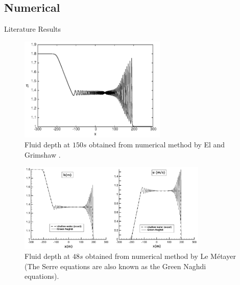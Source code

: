 \documentclass[pdf]{beamer}
\begin{document}
\subsection{Numerical}
\begin{frame}{Literature Results}
\begin{figure}
	\centering
	\includegraphics[width=7cm]{../Pics/Lit/SmoothDBEl.png}
	\caption{Fluid depth at $150s$ obtained from numerical method by El and Grimshaw \cite{El-etal-2006}.}
	\label{fig:ElDB}
\end{figure}	
\end{frame}

\begin{frame}{}
	\begin{figure}
		\centering
		\includegraphics[width=9cm]{../Pics/Lit/DBhank.png}
		\caption{Fluid depth at $48s$ obtained from numerical method by Le M\'{e}tayer \cite{Hank-etal-2010-2034} (The Serre equations are also known as the Green Naghdi equations).}
		\label{fig:HankDB}
	\end{figure}	
\end{frame}
\end{document}
